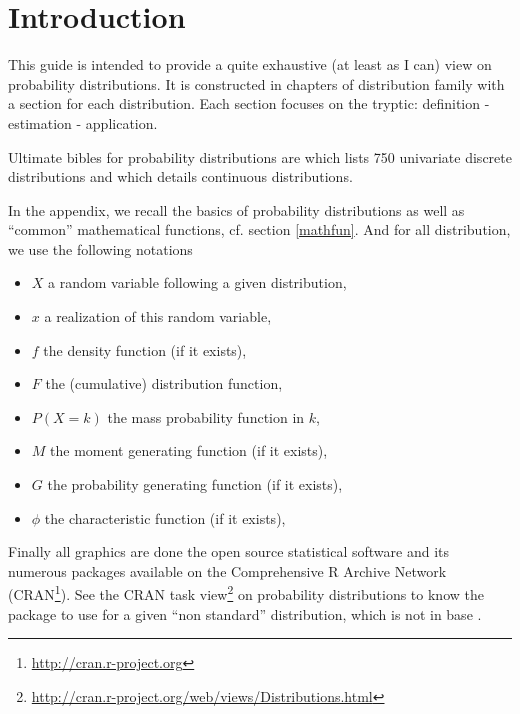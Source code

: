 \chapter*{Introduction}
This guide is intended to provide a quite exhaustive (at least as I can) view on probability distributions. It is constructed in chapters of distribution family with a section for each distribution. Each section focuses on the tryptic: definition - estimation - application.

Ultimate bibles for probability distributions are \cite{thesaurus} which lists 750 univariate discrete distributions and \cite{kotz} which details continuous distributions.

In the appendix, we recall the basics of probability distributions as well as ``common'' mathematical functions, cf. section \ref{mathfun}. And for all distribution, we use the following notations
\begin{itemize}
\item $X$ a random variable following a given distribution,
\item $x$ a realization of this random variable,
\item $f$ the density  function (if it exists),
\item $F$ the (cumulative) distribution function,
\item $P(X=k)$ the mass probability function in $k$,
\item $M$ the moment generating function (if it exists),
\item $G$ the probability generating function (if it exists),
\item $\phi$ the characteristic function (if it exists),
\end{itemize} 

Finally all graphics are done the open source statistical software  and its numerous packages available on the Comprehensive R Archive Network (CRAN\footnote{\url{http://cran.r-project.org}}). See the CRAN task view\footnote{\url{http://cran.r-project.org/web/views/Distributions.html}} on probability distributions to know the package to use for a given ``non standard'' distribution, which is not in base .

